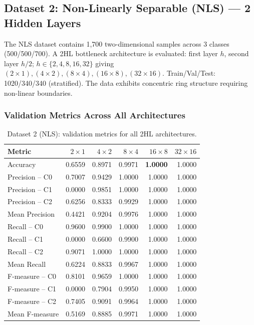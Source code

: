 \documentclass[11pt,a4paper]{article}
\begin{document}
\subsection{Dataset 2: Non-Linearly Separable (NLS) --- 2 Hidden Layers}

The NLS dataset contains 1,700 two-dimensional samples across 3 classes (500/500/700). A 2HL bottleneck architecture is evaluated: first layer $h$, second layer $h/2$; $h \in \{2,4,8,16,32\}$ giving $(2\times1),(4\times2),(8\times4),(16\times8),(32\times16)$. Train/Val/Test: 1020/340/340 (stratified). The data exhibits concentric ring structure requiring non-linear boundaries.

\subsubsection*{Validation Metrics Across All Architectures}

\begin{table}[H]
\centering
\caption{Dataset 2 (NLS): validation metrics for all 2HL architectures.}
\small
\begin{tabular}{lrrrrr}
\toprule
Metric & $2\times1$ & $4\times2$ & $8\times4$ & $16\times8$ & $32\times16$ \\
\midrule
Accuracy        & 0.6559 & 0.8971 & 0.9971 & \textbf{1.0000} & 1.0000 \\
Precision -- C0 & 0.7007 & 0.9429 & 1.0000 & 1.0000 & 1.0000 \\
Precision -- C1 & 0.0000 & 0.9851 & 1.0000 & 1.0000 & 1.0000 \\
Precision -- C2 & 0.6256 & 0.8333 & 0.9929 & 1.0000 & 1.0000 \\
Mean Precision  & 0.4421 & 0.9204 & 0.9976 & 1.0000 & 1.0000 \\
Recall -- C0    & 0.9600 & 0.9900 & 1.0000 & 1.0000 & 1.0000 \\
Recall -- C1    & 0.0000 & 0.6600 & 0.9900 & 1.0000 & 1.0000 \\
Recall -- C2    & 0.9071 & 1.0000 & 1.0000 & 1.0000 & 1.0000 \\
Mean Recall     & 0.6224 & 0.8833 & 0.9967 & 1.0000 & 1.0000 \\
F-measure -- C0 & 0.8101 & 0.9659 & 1.0000 & 1.0000 & 1.0000 \\
F-measure -- C1 & 0.0000 & 0.7904 & 0.9950 & 1.0000 & 1.0000 \\
F-measure -- C2 & 0.7405 & 0.9091 & 0.9964 & 1.0000 & 1.0000 \\
Mean F-measure  & 0.5169 & 0.8885 & 0.9971 & 1.0000 & 1.0000 \\
\bottomrule
\end{tabular}
\end{table}
\end{document}
